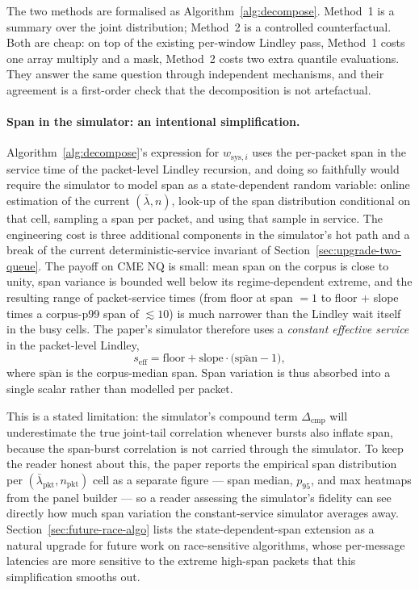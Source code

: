 \documentclass[11pt]{article}
\begin{document}
The two methods are formalised as Algorithm~\ref{alg:decompose}. Method~1 is a summary over the joint distribution; Method~2 is a controlled counterfactual. Both are cheap: on top of the existing per-window Lindley pass, Method~1 costs one array multiply and a mask, Method~2 costs two extra quantile evaluations. They answer the same question through independent mechanisms, and their agreement is a first-order check that the decomposition is not artefactual.

\paragraph{Span in the simulator: an intentional simplification.}
Algorithm~\ref{alg:decompose}'s expression for $w_{\mathrm{sys},i}$ uses the per-packet span in the service time of the packet-level Lindley recursion, and doing so faithfully would require the simulator to model span as a state-dependent random variable: online estimation of the current $(\bar\lambda, n)$, look-up of the span distribution conditional on that cell, sampling a span per packet, and using that sample in service. The engineering cost is three additional components in the simulator's hot path and a break of the current deterministic-service invariant of Section~\ref{sec:upgrade-two-queue}. The payoff on CME NQ is small: mean span on the corpus is close to unity, span variance is bounded well below its regime-dependent extreme, and the resulting range of packet-service times (from floor at span $= 1$ to floor + slope times a corpus-p99 span of $\lesssim 10$) is much narrower than the Lindley wait itself in the busy cells. The paper's simulator therefore uses a \emph{constant effective service} in the packet-level Lindley,
$$
s_{\mathrm{eff}} = \text{floor} + \text{slope} \cdot \bigl(\bar{\text{span}} - 1\bigr),
$$
where $\bar{\text{span}}$ is the corpus-median span. Span variation is thus absorbed into a single scalar rather than modelled per packet.

This is a stated limitation: the simulator's compound term $\Delta_{\mathrm{cmp}}$ will underestimate the true joint-tail correlation whenever bursts also inflate span, because the span-burst correlation is not carried through the simulator. To keep the reader honest about this, the paper reports the empirical span distribution per $(\bar\lambda_{\mathrm{pkt}}, n_{\mathrm{pkt}})$ cell as a separate figure --- span median, $p_{95}$, and max heatmaps from the panel builder --- so a reader assessing the simulator's fidelity can see directly how much span variation the constant-service simulator averages away. Section~\ref{sec:future-race-algo} lists the state-dependent-span extension as a natural upgrade for future work on race-sensitive algorithms, whose per-message latencies are more sensitive to the extreme high-span packets that this simplification smooths out.
\end{document}
